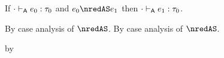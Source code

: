 \begin{lemma}\label{A-S-rr-preservation}
  If\/ $\snil \sWTA \sexpr_0 : \stype_0$
  and\/ $\sexpr_0 \nredAS \sexpr_1$
  then\/ $\snil \sWTA \sexpr_1 : \stype_0$.
\end{lemma}{
  \newcommand{\shortpf}{By case analysis of $\nredAS$.}
\begin{lamportproof*}
  \shortpf
\mainproof
  \shortpf

    \begin{pfproof}
      \qedstep
        \begin{pfproof}
          by 
        \end{pfproof}
    \end{pfproof}

    \begin{pfproof}
      \qedstep
        \begin{pfproof}
          \begin{mathpar}
          \end{mathpar}
        \end{pfproof}
    \end{pfproof}

    \begin{pfproof}
      \qedstep
        \begin{pfproof}
          \begin{mathpar}
          \end{mathpar}
        \end{pfproof}
    \end{pfproof}


\end{lamportproof*}}
